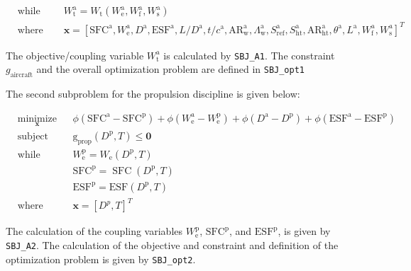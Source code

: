 \documentclass[11pt]{article}
\begin{document}
\begin{equation*}
\begin{aligned}
    & \text{while solving}
        & & W_{\mathrm{t}}^{\mathrm{a}}=W_{\mathrm{t}}\left(W_{\mathrm{e}}^{\mathrm{a}}, W_{\mathrm{f}}^{\mathrm{a}}, W_{\mathrm{s}}^{\mathrm{a}}\right)\\
    & \text{where}
        & & \mathbf{x} = \left[\mathrm{SFC}^{\mathrm{a}}, W_{\mathrm{e}}^{\mathrm{a}}, D^{\mathrm{a}}, \mathrm{ESF}^{\mathrm{a}}, L / D^{\mathrm{a}}, t / c^{\mathrm{a}}, \mathrm{AR}_{\mathrm{w}}^{\mathrm{a}}, \Lambda_{\mathrm{w}}^{\mathrm{a}}, S_{\mathrm{ref}}^{\mathrm{a}}, S_{\mathrm{ht}}^{\mathrm{a}}, \mathrm{AR}_{\mathrm{ht}}^{\mathrm{a}}, \theta^{\mathrm{a}}, L^{\mathrm{a}}, W_{\mathrm{f}}^{\mathrm{a}}, W_{\mathrm{s}}^{\mathrm{a}}\right]^\textit{T}
    \end{aligned}
\end{equation*}

The objective/coupling variable \(W_{\mathrm{t}}^{\mathrm{a}}\) is
calculated by \texttt{SBJ\_A1}. The constraint \(g_{\mathrm{aircraft}}\)
and the overall optimization problem are defined in \texttt{SBJ\_opt1}

The second subproblem for the propulsion discipline is given below:

\begin{equation*}
    \begin{aligned}
        & \underset{\mathbf{x}}{\text{minimize}}
        & & \phi\left(\mathrm{SFC}^{\mathrm{a}}-\mathrm{SFC}^{\mathrm{p}}\right)+\phi\left(W_{\mathrm{e}}^{\mathrm{a}}-W_{\mathrm{e}}^{\mathrm{p}}\right)+\phi\left(D^{\mathrm{a}}-D^{\mathrm{p}}\right)+\phi\left(\mathrm{ESF}^{\mathrm{a}}-\mathrm{ESF}^{\mathrm{p}}\right) \\
    & \text{subject to}
        & & \mathrm{g}_{\mathrm{prop}}\left(D^{\mathrm{p}}, T\right) \leq \mathbf{0} \\
    & \text{while solving}
        & & W_{\mathrm{e}}^{\mathrm{p}}=W_{\mathrm{e}}\left(D^{\mathrm{p}}, T\right) \\
    & & & \mathrm{SFC}^{\mathrm{p}}=\operatorname{SFC}\left(D^{\mathrm{p}}, T\right) \\
    & & & \mathrm{ESF}^{\mathrm{p}}=\mathrm{ESF}\left(D^{\mathrm{p}}, T\right) \\
    & \text{where}
        & & \mathbf{x} = \left[D^p,T\right]^\textit{T}
    \end{aligned}
\end{equation*}

The calculation of the coupling variables
\(W_{\mathrm{e}}^{\mathrm{p}}\), \(\mathrm{SFC}^{\mathrm{p}}\), and
\(\mathrm{ESF}^{\mathrm{p}}\), is given by \texttt{SBJ\_A2}. The
calculation of the objective and constraint and definition of the
optimization problem is given by \texttt{SBJ\_opt2}.
\end{document}
